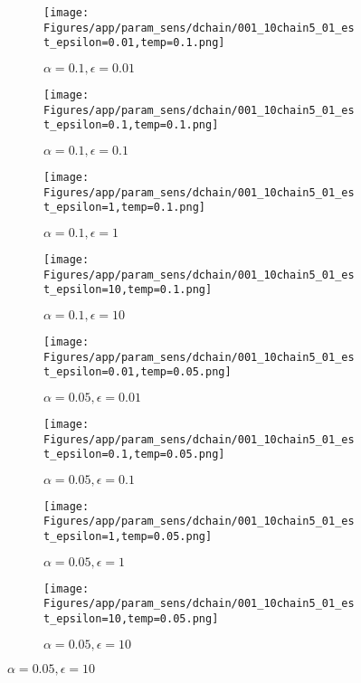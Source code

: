 \documentclass{article}
\theoremstyle{plain}
\begin{document}
\begin{appendices}
\begin{figure}
                \begin{subfigure}[b]{0.24\textwidth}
                    \centering
                    \texttt{[image: Figures/app/param\_sens/dchain/001\_10chain5\_01\_est\_epsilon=0.01,temp=0.1.png]}
                    \caption*{$\alpha=0.1,\epsilon=0.01$}
                \end{subfigure}
                \begin{subfigure}[b]{0.24\textwidth}
                    \centering
                    \texttt{[image: Figures/app/param\_sens/dchain/001\_10chain5\_01\_est\_epsilon=0.1,temp=0.1.png]}
                    \caption*{$\alpha=0.1,\epsilon=0.1$}
                \end{subfigure}
                \begin{subfigure}[b]{0.24\textwidth}
                    \centering
                    \texttt{[image: Figures/app/param\_sens/dchain/001\_10chain5\_01\_est\_epsilon=1,temp=0.1.png]}
                    \caption*{$\alpha=0.1,\epsilon=1$}
                \end{subfigure}
                \begin{subfigure}[b]{0.24\textwidth}
                    \centering
                    \texttt{[image: Figures/app/param\_sens/dchain/001\_10chain5\_01\_est\_epsilon=10,temp=0.1.png]}
                    \caption*{$\alpha=0.1,\epsilon=10$}
                \end{subfigure}
                
                \begin{subfigure}[b]{0.24\textwidth}
                    \centering
                    \texttt{[image: Figures/app/param\_sens/dchain/001\_10chain5\_01\_est\_epsilon=0.01,temp=0.05.png]}
                    \caption*{$\alpha=0.05,\epsilon=0.01$}
                \end{subfigure}
                \begin{subfigure}[b]{0.24\textwidth}
                    \centering
                    \texttt{[image: Figures/app/param\_sens/dchain/001\_10chain5\_01\_est\_epsilon=0.1,temp=0.05.png]}
                    \caption*{$\alpha=0.05,\epsilon=0.1$}
                \end{subfigure}
                \begin{subfigure}[b]{0.24\textwidth}
                    \centering
                    \texttt{[image: Figures/app/param\_sens/dchain/001\_10chain5\_01\_est\_epsilon=1,temp=0.05.png]}
                    \caption*{$\alpha=0.05,\epsilon=1$}
                \end{subfigure}
                \begin{subfigure}[b]{0.24\textwidth}
                    \centering
                    \texttt{[image: Figures/app/param\_sens/dchain/001\_10chain5\_01\_est\_epsilon=10,temp=0.05.png]}
                    \caption*{$\alpha=0.05,\epsilon=10$}
                \end{subfigure}
                

\end{figure}
\end{appendices}
\end{document}
